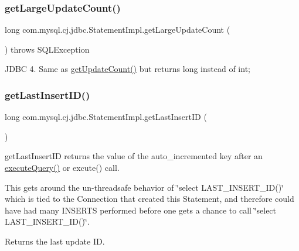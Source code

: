 \subsubsection{\texorpdfstring{get\+Large\+Update\+Count()}{getLargeUpdateCount()}}
{\footnotesize\ttfamily long com.\+mysql.\+cj.\+jdbc.\+Statement\+Impl.\+get\+Large\+Update\+Count (\begin{DoxyParamCaption}{ }\end{DoxyParamCaption}) throws S\+Q\+L\+Exception}

J\+D\+BC 4. Same as \mbox{\hyperlink{classcom_1_1mysql_1_1cj_1_1jdbc_1_1_statement_impl_abb1d31f01f22e76a4d2a03c26905cb2e}{get\+Update\+Count()}} but returns long instead of int; \mbox{\label{classcom_1_1mysql_1_1cj_1_1jdbc_1_1_statement_impl_af48b4bdf41d529d92def194cbe611acf}} 
\subsubsection{\texorpdfstring{get\+Last\+Insert\+I\+D()}{getLastInsertID()}}
{\footnotesize\ttfamily long com.\+mysql.\+cj.\+jdbc.\+Statement\+Impl.\+get\+Last\+Insert\+ID (\begin{DoxyParamCaption}{ }\end{DoxyParamCaption})}

get\+Last\+Insert\+ID returns the value of the auto\+\_\+incremented key after an \mbox{\hyperlink{classcom_1_1mysql_1_1cj_1_1jdbc_1_1_statement_impl_ad8bdf41d3e788681fe1adcf961b176ef}{execute\+Query()}} or excute() call.

This gets around the un-\/threadsafe behavior of \char`\"{}select L\+A\+S\+T\+\_\+\+I\+N\+S\+E\+R\+T\+\_\+\+I\+D()\char`\"{} which is tied to the Connection that created this Statement, and therefore could have had many I\+N\+S\+E\+R\+TS performed before one gets a chance to call \char`\"{}select L\+A\+S\+T\+\_\+\+I\+N\+S\+E\+R\+T\+\_\+\+I\+D()\char`\"{}. 

\begin{DoxyReturn}{Returns}
the last update ID. 
\end{DoxyReturn}
\mbox{\label{classcom_1_1mysql_1_1cj_1_1jdbc_1_1_statement_impl_a52f35ba4029870388a69d493851e726a}} 
